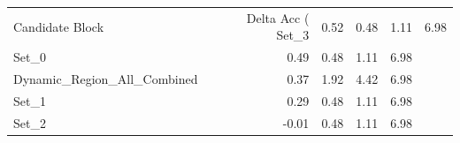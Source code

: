 \begin{tabular}{lrrrr}
\toprule
Candidate Block & Delta Acc (%
\midrule
Set_3 & 0.52 & 0.48 & 1.11 & 6.98 \\
Set_0 & 0.49 & 0.48 & 1.11 & 6.98 \\
Dynamic_Region_All_Combined & 0.37 & 1.92 & 4.42 & 6.98 \\
Set_1 & 0.29 & 0.48 & 1.11 & 6.98 \\
Set_2 & -0.01 & 0.48 & 1.11 & 6.98 \\
\bottomrule
\end{tabular}
